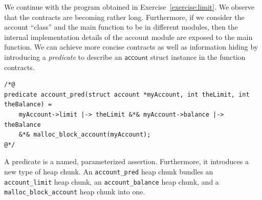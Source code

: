 \documentclass{article}
\begin{document}
We continue with the program obtained in
Exercise~\ref{exercise:limit}. We observe that the contracts
are becoming rather long. Furthermore, if we consider the
account ``class'' and the main function to be in different
modules, then the internal implementation details of the
account module are exposed to the main function. We can achieve
more concise contracts as well as information hiding by
introducing a \emph{predicate} to describe an
$\mathsf{account}$ struct instance in the function contracts.
\begin{lstlisting}
/*@
predicate account_pred(struct account *myAccount, int theLimit, int theBalance) =
    myAccount->limit |-> theLimit &*& myAccount->balance |-> theBalance
    &*& malloc_block_account(myAccount);
@*/
\end{lstlisting}
A predicate is a named, parameterized assertion. Furthermore, it introduces a new type of heap chunk.
An \lstinline!account_pred! heap chunk bundles an \lstinline!account_limit! heap chunk, an \lstinline!account_balance! heap chunk,
and a \lstinline!malloc_block_account! heap chunk into one.
\end{document}
